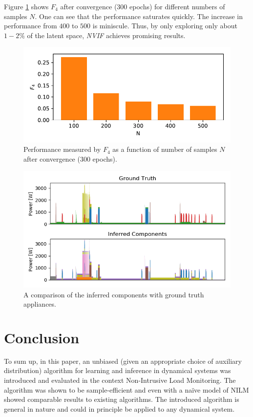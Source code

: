   Figure \ref{f4} shows $F_4$ after convergence (300 epochs) for different numbers of samples $N$. One can see that the performance saturates quickly. The increase in performance from $400$ to $500$ is miniscule. Thus, by only exploring only about $1-2\%$ of the latent space, \emph{NVIF} achieves promising results.
  \begin{figure}
      \centering
        \includegraphics[width=0.8\linewidth]{nvif/losses3.pdf}
      \caption[NVIF: Performance as a function of number of samples.]{Performance measured by $F_4$ as a function of number of samples $N$ after convergence (300 epochs).}
      \label{f4}
  \end{figure}
  
   \begin{figure}[h!]
      \centering
        \includegraphics[width=0.8\linewidth]{nvif/inferred.png}
      \caption[NVIF: A comparison of the inferred components with ground truth appliances.]{A comparison of the inferred components with ground truth appliances.}
      \label{nvif:inferred}
  \end{figure}
  

\section{Conclusion}
To sum up, in this paper, an unbiased (given an appropriate choice of auxiliary distribution) algorithm for learning and inference in dynamical systems was introduced and evaluated in the context Non-Intrusive Load Monitoring. The algorithm was shown to be sample-efficient and even with a na\"ive model of NILM showed comparable results to existing algorithms. The introduced algorithm is general in nature and could in principle be applied to any dynamical system.